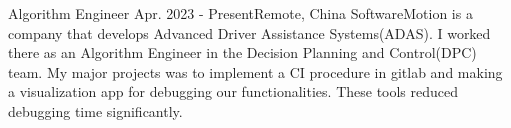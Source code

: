 \resumeSubheadingReza
{Algorithm Engineer}{}
{Apr. 2023 - Present}{Remote, China}
{SoftwareMotion is a company that develops Advanced Driver Assistance Systems(ADAS). I worked there as an Algorithm Engineer in the Decision Planning and Control(DPC) team. My major projects was to implement a CI procedure in gitlab and making a visualization app for debugging our functionalities. These tools reduced debugging time significantly.}
